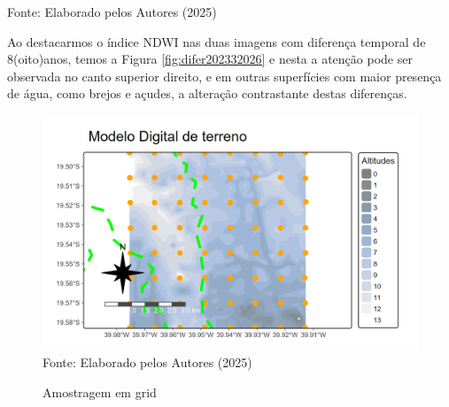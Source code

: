  			\begin{center}
 				Fonte:   Elaborado pelos Autores (2025)
 			\end{center}
 \hspace*{1.25 cm}  Ao destacarmos o índice NDWI nas duas imagens com diferença temporal de 8(oito)anos, temos a Figura   \ref{fig:difer202332026} e nesta a atenção pode ser observada no canto superior direito, e em outras superfícies com maior presença de água, como brejos e açudes, a alteração contrastante destas diferenças.  \\
  \begin{figure}
	\begin{center}
		\centering  \small \caption{Amostragem em grid}
		\includegraphics[width=0.97\linewidth]{FIGURAS/mdtamostras}
		\label{fig:mdtamostras}\\{ Fonte:   Elaborado pelos Autores (2025)}
	\end{center}
\end{figure} 
